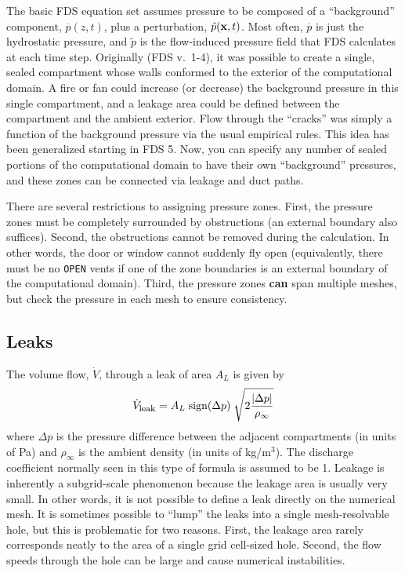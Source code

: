 \documentclass[11pt]{book}
\newcommand{\ct}{\tt\small}
\newcommand{\bx}{{\bf x}}
\newcommand{\tp}{\tilde{p}}
\newcommand{\bp}{\overline{p}}
\newcommand{\be}{\begin{equation}}
\newcommand{\ee}{\end{equation}}
\begin{document}
The basic FDS equation set assumes pressure
to be composed of a ``background'' component, $\bp(z,t)$, plus a perturbation, $\tp(\bx,t)$. Most
often, $\bp$ is just the hydrostatic pressure, and $\tp$ is the flow-induced pressure field that
FDS calculates at each time step. Originally (FDS v.~1-4), it was possible to create a single, sealed
compartment whose walls conformed to the exterior of the computational domain. A fire or fan could
increase (or decrease) the background pressure in this single compartment, and a leakage area could
be defined between the compartment and the ambient exterior. Flow through the ``cracks'' was simply
a function of the background pressure via the usual empirical rules.
This idea has been generalized starting in FDS 5. Now, you can specify any number of sealed portions of the computational
domain to have their own ``background'' pressures, and these zones can be connected via leakage and duct paths.

There are several restrictions to assigning pressure zones. First, the pressure zones must be completely surrounded by
obstructions (an external boundary also suffices).
Second, the obstructions cannot be removed during the calculation. In other words, the door or window cannot
suddenly fly open (equivalently, there must be no {\ct OPEN} vents if one of the zone boundaries
is an external boundary of the computational domain).
Third, the pressure zones {\bf can} span multiple meshes,
but check the pressure in each mesh to ensure consistency.


\subsection{Leaks}
\label{info:Leaks}

The volume flow, $\dot{V}$, through a leak of area $A_L$ is given by
\be  \dot{V}_{\hbox{\footnotesize leak}} = A_L \; \hbox{sign} (\Delta p) \; \sqrt{2 \frac{ | \Delta p |}{\rho_\infty}} \ee
where $\Delta p$ is the pressure difference between the adjacent compartments (in units of Pa) and
$\rho_\infty$ is the ambient density (in units of kg/m$^3$). The discharge coefficient normally seen in this type of formula is assumed
to be 1. Leakage is inherently a subgrid-scale phenomenon because the leakage area is usually very small. In other words, it is not possible to define a leak directly on the
numerical mesh. It is sometimes possible to ``lump'' the leaks into a single mesh-resolvable hole, but this is problematic
for two reasons. First, the leakage area rarely corresponds neatly to the area of a single grid cell-sized hole. Second, the
flow speeds through the hole can be large and cause numerical instabilities.
\end{document}
